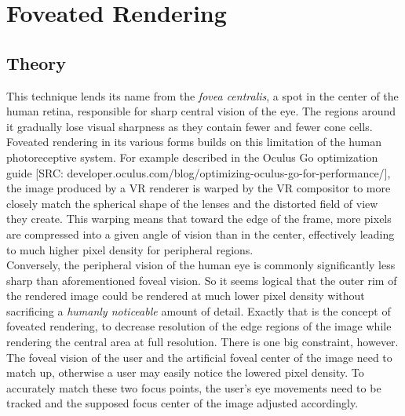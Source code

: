 
\section{Foveated Rendering}
\subsection{Theory}
This technique lends its name from the \textit{fovea centralis}, a spot in the center of the human retina, responsible for sharp central vision of the eye. The regions around it gradually lose visual sharpness as they contain fewer and fewer cone cells. 
Foveated rendering in its various forms builds on this limitation of the human photoreceptive system. For example described in the Oculus Go optimization guide [SRC: developer.oculus.com/blog/optimizing-oculus-go-for-performance/], the image produced by a VR renderer is warped by the VR compositor to more closely match the spherical shape of the lenses and the distorted field of view they create. This warping means that toward the edge of the frame, more pixels are compressed into a given angle of vision than in the center, effectively leading to much higher pixel density for peripheral regions. \\
Conversely, the peripheral vision of the human eye is commonly significantly less sharp than aforementioned foveal vision. So it seems logical that the outer rim of the rendered image could be rendered at much lower pixel density without sacrificing a \textit{humanly noticeable} amount of detail. 
Exactly that is the concept of foveated rendering, to decrease resolution of the edge regions of the image while rendering the central area at full resolution. 
There is one big constraint, however. The foveal vision of the user and the artificial foveal center of the image need to match up, otherwise a user may easily notice the lowered pixel density. To accurately match these two focus points, the user's eye movements need to be tracked and the supposed focus center of the image adjusted accordingly. 


